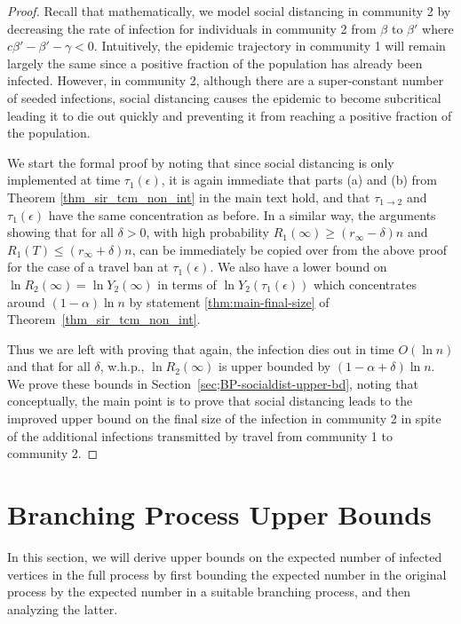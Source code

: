 \documentclass[11pt]{article}
\begin{document}
 \begin{proof}
Recall that mathematically, we model social distancing in community 2 by decreasing the rate of infection for individuals in community 2 from $\beta$ to $\beta'$ where $c\beta' - \beta' - \gamma < 0$. Intuitively, the epidemic trajectory in community 1 will remain largely the same since a positive fraction of the population has already been infected. However, in community 2, although there are a super-constant number of seeded infections, social distancing causes the epidemic to become subcritical leading it to die out quickly and preventing it from reaching a positive fraction of the population.

We start the formal proof by noting that 
since social distancing is only  implemented at time $\tau_1(\epsilon)$,
it is again immediate that parts (a) and (b) from Theorem \ref{thm_sir_tcm_non_int} in the main text hold, and that $\tau_{1\to 2}$ and $\tau_1(\epsilon)$ have the same concentration as before.
 In a similar way, the arguments showing that for all $\delta>0$, with high probability 
$R_1(\infty) \geq (r_\infty - \delta)n$ and  $R_1(T)\leq (r_\infty + \delta)n$, can be immediately be copied over from the above proof for the case of a travel ban at $\tau_1(\epsilon)$. We also have a lower bound on $\ln R_2(\infty)=\ln Y_2(\infty)$ in terms of $\ln Y_2(\tau_1(\epsilon))$ which concentrates around $(1-\alpha)\ln n$ by statement \ref{thm:main-final-size} of Theorem~\ref{thm_sir_tcm_non_int}.

Thus we are left with proving that again, the infection dies out in time $O(\ln n)$ and that for all $\delta$, w.h.p.,  $\ln R_2(\infty)$ is upper bounded by $(1-\alpha+\delta)\ln n$.
We prove these bounds in Section~\ref{sec;BP-socialdist-upper-bd}, noting that conceptually, the main point is to prove that social distancing leads to the improved upper bound on the final size of the infection in community 2 in spite of the additional infections transmitted by travel from community 1 to community 2.
\end{proof}



\section{Branching Process Upper Bounds}\label{sec:BP-upper-bounds}

In this section, we will derive upper bounds on the expected number of infected vertices in the full process by first bounding the expected number in the original process by the expected number in a suitable branching process, and then analyzing the latter.
\end{document}
